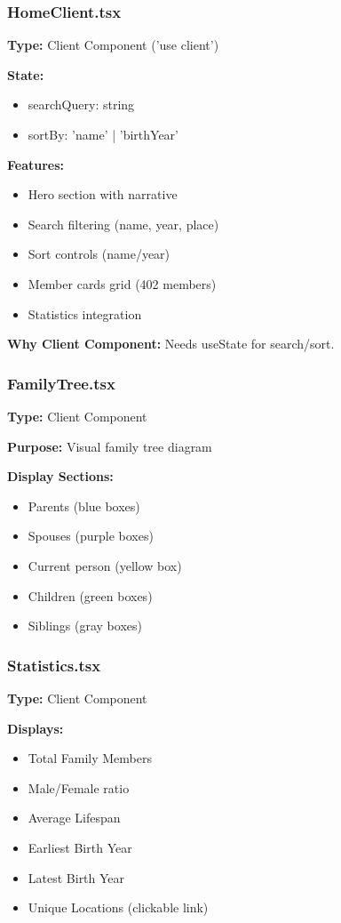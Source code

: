 \documentclass[11pt]{article}
\begin{document}
\subsubsection{HomeClient.tsx}
\textbf{Type:} Client Component ('use client')

\textbf{State:}
\begin{itemize}
    \item searchQuery: string
    \item sortBy: 'name' | 'birthYear'
\end{itemize}

\textbf{Features:}
\begin{itemize}
    \item Hero section with narrative
    \item Search filtering (name, year, place)
    \item Sort controls (name/year)
    \item Member cards grid (402 members)
    \item Statistics integration
\end{itemize}

\textbf{Why Client Component:} Needs useState for search/sort.

\subsubsection{FamilyTree.tsx}
\textbf{Type:} Client Component

\textbf{Purpose:} Visual family tree diagram

\textbf{Display Sections:}
\begin{itemize}
    \item Parents (blue boxes)
    \item Spouses (purple boxes)
    \item Current person (yellow box)
    \item Children (green boxes)
    \item Siblings (gray boxes)
\end{itemize}

\subsubsection{Statistics.tsx}
\textbf{Type:} Client Component

\textbf{Displays:}
\begin{itemize}
    \item Total Family Members
    \item Male/Female ratio
    \item Average Lifespan
    \item Earliest Birth Year
    \item Latest Birth Year
    \item Unique Locations (clickable link)
\end{itemize}
\end{document}
